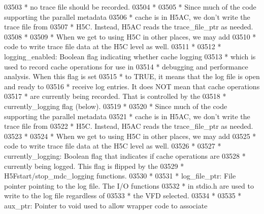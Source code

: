 \begin{DoxyCode}
03503 \textcolor{comment}{ *              no trace file should be recorded.}
03504 \textcolor{comment}{ *}
03505 \textcolor{comment}{ *              Since much of the code supporting the parallel metadata}
03506 \textcolor{comment}{ *              cache is in H5AC, we don't write the trace file from}
03507 \textcolor{comment}{ *              H5C.  Instead, H5AC reads the trace\_file\_ptr as needed.}
03508 \textcolor{comment}{ *}
03509 \textcolor{comment}{ *              When we get to using H5C in other places, we may add}
03510 \textcolor{comment}{ *              code to write trace file data at the H5C level as well.}
03511 \textcolor{comment}{ *}
03512 \textcolor{comment}{ * logging\_enabled: Boolean flag indicating whether cache logging}
03513 \textcolor{comment}{ *              which is used to record cache operations for use in}
03514 \textcolor{comment}{ *              debugging and performance analysis. When this flag is set}
03515 \textcolor{comment}{ *              to TRUE, it means that the log file is open and ready to}
03516 \textcolor{comment}{ *              receive log entries. It does NOT mean that cache operations}
03517 \textcolor{comment}{ *              are currently being recorded. That is controlled by the}
03518 \textcolor{comment}{ *              currently\_logging flag (below).}
03519 \textcolor{comment}{ *}
03520 \textcolor{comment}{ *              Since much of the code supporting the parallel metadata}
03521 \textcolor{comment}{ *              cache is in H5AC, we don't write the trace file from}
03522 \textcolor{comment}{ *              H5C.  Instead, H5AC reads the trace\_file\_ptr as needed.}
03523 \textcolor{comment}{ *}
03524 \textcolor{comment}{ *              When we get to using H5C in other places, we may add}
03525 \textcolor{comment}{ *              code to write trace file data at the H5C level as well.}
03526 \textcolor{comment}{ *}
03527 \textcolor{comment}{ * currently\_logging: Boolean flag that indicates if cache operations are}
03528 \textcolor{comment}{ *              currently being logged. This flag is flipped by the}
03529 \textcolor{comment}{ *              H5Fstart/stop\_mdc\_logging functions.}
03530 \textcolor{comment}{ *}
03531 \textcolor{comment}{ * log\_file\_ptr:  File pointer pointing to the log file. The I/O functions}
03532 \textcolor{comment}{ *              in stdio.h are used to write to the log file regardless of}
03533 \textcolor{comment}{ *              the VFD selected.}
03534 \textcolor{comment}{ *}
03535 \textcolor{comment}{ * aux\_ptr: Pointer to void used to allow wrapper code to associate}

\end{DoxyCode}
